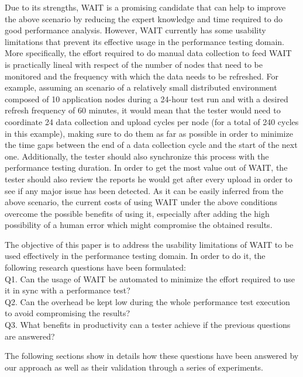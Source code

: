 \documentclass[runningheads,a4paper]{llncs}
\begin{document}
Due to its strengths, WAIT is a promising candidate that can help to improve the
above scenario by reducing the expert knowledge and time required to do good
performance analysis. However, WAIT currently has some usability limitations
that prevent its effective usage in the performance testing domain. More
specifically, the effort required to do manual data collection to feed WAIT is
practically lineal with respect of the number of nodes that need to be monitored
and the frequency with which the data needs to be refreshed. For example,
assuming an scenario of a relatively small distributed environment composed
of 10 application nodes during a 24-hour test run and with a desired refresh
frequency of 60 minutes, it would mean that the tester would need to coordinate 
24 data collection and upload cycles per node (for a total of 240
cycles in this example), making sure to do them as far as possible in order to
minimize the time gaps between the end of a data collection cycle and the
start of the next one. Additionally, the tester should also synchronize this
process with the performance testing duration. In order to get the most value
out of WAIT, the tester should also review the reports he would get after every 
upload in order to see if any major issue has been detected. As it can be easily inferred from
the above scenario, the current costs of using WAIT under the above conditions
overcome the possible benefits of using it, especially after adding the high
possibility of a human error which might compromise the obtained results.

The objective of this paper is to address the usability limitations of WAIT to
be used effectively in the performance testing domain. In order to do it, the
following research questions have been formulated:
\\Q1. Can the usage of WAIT be automated to minimize the effort
required to use it in sync with a performance test?
\\Q2. Can the overhead be kept low during the whole performance test
execution to avoid compromising the results? 
\\Q3. What benefits in productivity can a tester achieve if the previous
questions are answered?

The following sections show in details how these questions have been answered by
our approach as well as their validation through a series of experiments.

\end{document}
